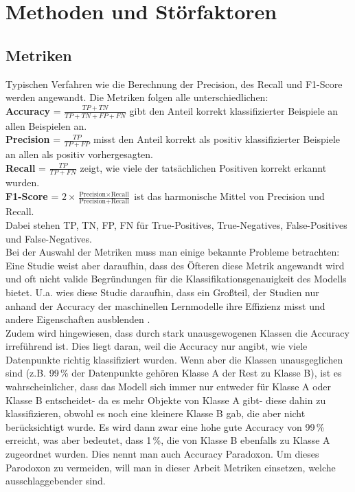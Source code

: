 \documentclass[a4paper,12pt]{article}
\begin{document}
	\section{Methoden und Störfaktoren}
	\subsection{Metriken}
	Typischen Verfahren wie die Berechnung der Precision, des Recall und F1-Score werden angewandt. Die Metriken folgen alle unterschiedlichen:
	\\[0.5em]
	\textbf{Accuracy} = \(\frac{TP + TN}{TP + TN + FP + FN}\) gibt den Anteil korrekt klassifizierter Beispiele an allen Beispielen an.
	\\[0.5em]
	\textbf{Precision} = \(\frac{TP}{TP + FP}\) misst den Anteil korrekt als positiv klassifizierter Beispiele an allen als positiv vorhergesagten. 
	\\[0.5em]
	\textbf{Recall} = \(\frac{TP}{TP + FN}\) zeigt, wie viele der tatsächlichen Positiven korrekt erkannt wurden. 
	\\[0.5em]
	\textbf{F1-Score} = \(2 \times \frac{\text{Precision} \times \text{Recall}}{\text{Precision} + \text{Recall}}\) ist das harmonische Mittel von Precision und Recall. 
	\\[0.5em]
	Dabei stehen TP, TN, FP, FN für True-Positives, True-Negatives, False-Positives und False-Negatives.
	\\[0.5em]
	Bei der Auswahl der Metriken muss man einige bekannte Probleme betrachten:
	\\[0.5em]
	Eine Studie weist aber daraufhin, dass des Öfteren diese Metrik angewandt wird und oft nicht valide Begründungen für die Klassifikationsgenauigkeit des Modells bietet. U.a. wies diese Studie daraufhin, dass ein Großteil, der Studien nur anhand der Accuracy der maschinellen Lernmodelle ihre Effizienz misst und andere Eigenschaften ausblenden \cite{provost1998case}. 
	\\[0.5em]
	Zudem wird hingewiesen, dass durch stark unausgewogenen Klassen die Accuracy irreführend ist. Dies liegt daran, weil die Accuracy nur angibt, wie viele Datenpunkte richtig klassifiziert wurden. Wenn aber die Klassen unausgeglichen sind (z.B. 99\,\% der Datenpunkte gehören Klasse A der Rest zu Klasse B), ist es wahrscheinlicher, dass das Modell sich immer nur entweder für Klasse A oder Klasse B entscheidet- da es mehr Objekte von Klasse A gibt- diese dahin zu klassifizieren, obwohl es noch eine kleinere Klasse B gab, die aber nicht berücksichtigt wurde. Es wird dann zwar eine hohe gute Accuracy von 99\,\% erreicht, was aber bedeutet, dass 1\,\%, die von Klasse B ebenfalls zu Klasse A zugeordnet wurden. Dies nennt man auch Accuracy Paradoxon. Um dieses Parodoxon zu vermeiden, will man in dieser Arbeit Metriken einsetzen, welche ausschlaggebender sind. 
\end{document}
